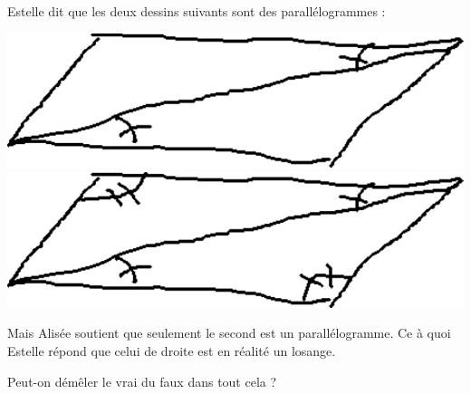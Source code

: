 
\begin{exercice}\label{exo2smath-0178}

    Estelle dit que les deux dessins suivants sont des parallélogrammes :
    \begin{center}
    \includegraphics[width=\linewidth]{codage_parall1.pdf}
    \includegraphics[width=\linewidth]{codage_parall2.pdf}
    \end{center}
    Mais Alisée soutient que seulement le second est un parallélogramme. Ce à quoi Estelle répond que celui de droite est en réalité un losange.

    Peut-on démêler le vrai du faux dans tout cela ?

\end{exercice}
